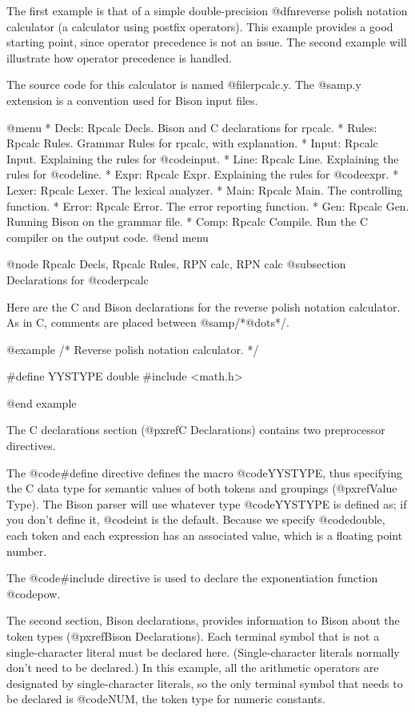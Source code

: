 {The first example is that of a simple double-precision @dfn{reverse polish
notation} calculator (a calculator using postfix operators).  This example
provides a good starting point, since operator precedence is not an issue.
The second example will illustrate how operator precedence is handled.

The source code for this calculator is named @file{rpcalc.y}.  The
@samp{.y} extension is a convention used for Bison input files.

@menu
* Decls: Rpcalc Decls.    Bison and C declarations for rpcalc.
* Rules: Rpcalc Rules.    Grammar Rules for rpcalc, with explanation.
* Input: Rpcalc Input.    Explaining the rules for @code{input}.
* Line: Rpcalc Line.      Explaining the rules for @code{line}.
* Expr: Rpcalc Expr.      Explaining the rules for @code{expr}.
* Lexer: Rpcalc Lexer.    The lexical analyzer.
* Main: Rpcalc Main.      The controlling function.
* Error: Rpcalc Error.    The error reporting function.
* Gen: Rpcalc Gen.        Running Bison on the grammar file.
* Comp: Rpcalc Compile.   Run the C compiler on the output code.
@end menu

@node Rpcalc Decls, Rpcalc Rules, RPN calc, RPN calc
@subsection Declarations for @code{rpcalc}

Here are the C and Bison declarations for the reverse polish notation
calculator.  As in C, comments are placed between @samp{/*@dots{}*/}.

@example
/* Reverse polish notation calculator. */

#define YYSTYPE double
#include <math.h>


@end example

The C declarations section (@pxref{C Declarations}) contains two
preprocessor directives.

The @code{#define} directive defines the macro @code{YYSTYPE}, thus
specifying the C data type for semantic values of both tokens and groupings
(@pxref{Value Type}).  The Bison parser will use whatever type
@code{YYSTYPE} is defined as; if you don't define it, @code{int} is the
default.  Because we specify @code{double}, each token and each expression
has an associated value, which is a floating point number.

The @code{#include} directive is used to declare the exponentiation
function @code{pow}.

The second section, Bison declarations, provides information to Bison about
the token types (@pxref{Bison Declarations}).  Each terminal symbol that is
not a single-character literal must be declared here.  (Single-character
literals normally don't need to be declared.)  In this example, all the
arithmetic operators are designated by single-character literals, so the
only terminal symbol that needs to be declared is @code{NUM}, the token
type for numeric constants.

}
